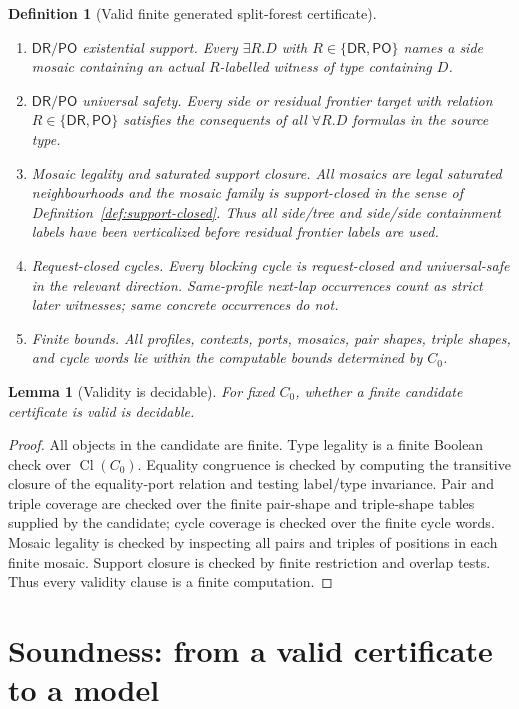 \documentclass[11pt]{article}
\newtheorem{lemma}[theorem]{Lemma}
\newtheorem{definition}[theorem]{Definition}
\newcommand{\DR}{\mathsf{DR}}
\newcommand{\PO}{\mathsf{PO}}
\newcommand{\Cl}{\operatorname{Cl}}
\begin{document}
\begin{definition}[Valid finite generated split-forest certificate]
\begin{enumerate}[label=(V\arabic*)]
\item \emph{$\DR/\PO$ existential support.}  Every $\exists R.D$ with $R\in\{\DR,\PO\}$ names a side mosaic containing an actual $R$-labelled witness of type containing $D$.
\item \emph{$\DR/\PO$ universal safety.}  Every side or residual frontier target with relation $R\in\{\DR,\PO\}$ satisfies the consequents of all $\forall R.D$ formulas in the source type.
\item \emph{Mosaic legality and saturated support closure.}  All mosaics are legal saturated neighbourhoods and the mosaic family is support-closed in the sense of Definition~\ref{def:support-closed}.  Thus all side/tree and side/side containment labels have been verticalized before residual frontier labels are used.
\item \emph{Request-closed cycles.}  Every blocking cycle is request-closed and universal-safe in the relevant direction.  Same-profile next-lap occurrences count as strict later witnesses; same concrete occurrences do not.
\item \emph{Finite bounds.}  All profiles, contexts, ports, mosaics, pair shapes, triple shapes, and cycle words lie within the computable bounds determined by $C_0$.
\end{enumerate}
\end{definition}

\begin{lemma}[Validity is decidable]\label{lem:validity-decidable}
For fixed $C_0$, whether a finite candidate certificate is valid is decidable.
\end{lemma}

\begin{proof}
All objects in the candidate are finite.  Type legality is a finite Boolean check over $\Cl(C_0)$.  Equality congruence is checked by computing the transitive closure of the equality-port relation and testing label/type invariance.  Pair and triple coverage are checked over the finite pair-shape and triple-shape tables supplied by the candidate; cycle coverage is checked over the finite cycle words.  Mosaic legality is checked by inspecting all pairs and triples of positions in each finite mosaic.  Support closure is checked by finite restriction and overlap tests.  Thus every validity clause is a finite computation.
\end{proof}

\section{Soundness: from a valid certificate to a model}
\end{document}

